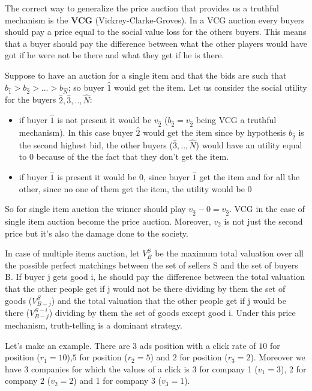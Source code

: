 The correct way to generalize the  price auction that provides us a truthful mechanism is the \textbf{VCG} (Vickrey-Clarke-Groves). In a VCG auction every buyers should pay a price equal to the social value loss for the others buyers. This means that a buyer should pay the difference between what the other players would have got if he were not be there and what they  get if he is there.

Suppose to have an auction for a single item and that the bids are such that $b_{\hat1}>b_{\hat2}>...>b_{\hat N}$; so buyer $\hat1$ would get the item. Let us consider the social utility for the buyers $\hat2,\hat3,..,\hat N$:

\begin{itemize}
	\item if buyer $\hat1$ is not present it would be $v_{\hat2}$ ($b_{\hat2}=v_{\hat2}$ being VCG a truthful mechanism). In this case buyer $\hat2$ would get the item since by hypothesis $b_{\hat2}$ is the second highest bid, the other buyers ($\hat3,..,\hat N$) would have an utility equal to $0$ because of the the fact that they don't get the item. 
	\item if buyer $\hat1$ is present it would be $0$, since buyer $\hat1$ get the item and for all the other, since no one of them get the item, the utility would be $0$ 
\end{itemize}

So for single item auction the winner should play $v_{\hat2}-0=v_{\hat2}$. VCG in the case of single item auction become the  price auction. Moreover, $v_2$ is not just the second price but it's also the damage done to the society.

In case of multiple items auction, let $V_{B}^{S}$ be the maximum total valuation over all the possible perfect matchings between the set of sellers S and the set of buyers B. If buyer j gets good i, he should pay the difference between the total valuation that the other people get if j would not be there dividing by them the set of goods ($V_{B-j}^{S}$) and the total valuation that the other people get if j would be there ($V_{B-j}^{S-i}$) dividing by them the set of goods except good i. Under this price mechanism, truth-telling is a dominant strategy.

Let's make an example. There are 3 ads position with a click rate of $10$ for  position ($r_1=10$),$5$ for  position ($r_2=5$) and $2$ for  position ($r_3=2$). Moreover we have 3 companies for which the values of a click is 3 for company 1 ($v_1=3$), 2 for company 2 ($v_2=2$) and 1 for company 3 ($v_3=1$).

